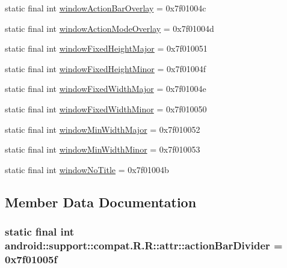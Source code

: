 \begin{CompactItemize}
\item 
static final int \hyperlink{classandroid_1_1support_1_1compat_1_1_r_1_1attr_cf23915cb13de444abb7765f9339bf54}{windowActionBarOverlay} = 0x7f01004c
\item 
static final int \hyperlink{classandroid_1_1support_1_1compat_1_1_r_1_1attr_850845d98bbb149b2115f17dc02b0043}{windowActionModeOverlay} = 0x7f01004d
\item 
static final int \hyperlink{classandroid_1_1support_1_1compat_1_1_r_1_1attr_dddeb276735743ac301369d89f03fbe0}{windowFixedHeightMajor} = 0x7f010051
\item 
static final int \hyperlink{classandroid_1_1support_1_1compat_1_1_r_1_1attr_81ad93c2efdd833bbb340cd7920817cd}{windowFixedHeightMinor} = 0x7f01004f
\item 
static final int \hyperlink{classandroid_1_1support_1_1compat_1_1_r_1_1attr_10dd3689e17a6e96b12952dc0eb49b07}{windowFixedWidthMajor} = 0x7f01004e
\item 
static final int \hyperlink{classandroid_1_1support_1_1compat_1_1_r_1_1attr_043b8c6c0a06d86b897e5bfd5f426538}{windowFixedWidthMinor} = 0x7f010050
\item 
static final int \hyperlink{classandroid_1_1support_1_1compat_1_1_r_1_1attr_c75373813fbe541ee5c3396d88a0a640}{windowMinWidthMajor} = 0x7f010052
\item 
static final int \hyperlink{classandroid_1_1support_1_1compat_1_1_r_1_1attr_487d6d3519ee2404229f34a41cdebc44}{windowMinWidthMinor} = 0x7f010053
\item 
static final int \hyperlink{classandroid_1_1support_1_1compat_1_1_r_1_1attr_5e474d0d0e901acc2446b9998ae437f2}{windowNoTitle} = 0x7f01004b
\end{CompactItemize}


\subsection{Member Data Documentation}
\hypertarget{classandroid_1_1support_1_1compat_1_1_r_1_1attr_3833129e4ad3188ef3b72a8b44971f9a}{
\subsubsection[{actionBarDivider}]{\setlength{\rightskip}{0pt plus 5cm}static final int android::support::compat.R.R::attr::actionBarDivider = 0x7f01005f}}
\label{classandroid_1_1support_1_1compat_1_1_r_1_1attr_3833129e4ad3188ef3b72a8b44971f9a}


